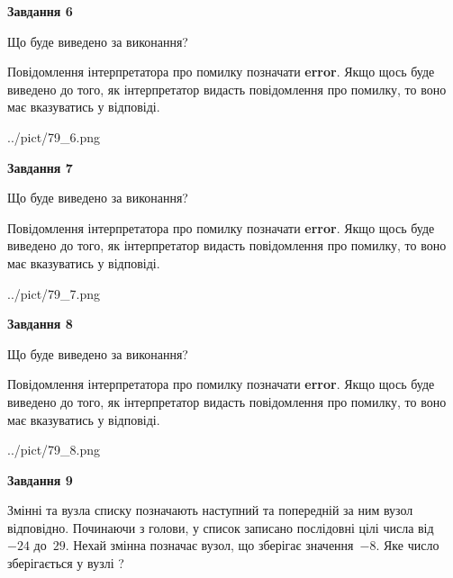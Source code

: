 \documentclass[12pt, ukrainian]{article}
\begin{document}
{\begin {large}
{\begin {center}\textbf{Завдання 6}\end {center}}\par
Що буде виведено за виконання?

Повідомлення інтерпретатора про помилку позначати \textbf{error}.
Якщо щось буде виведено до того, як інтерпретатор видасть повідомлення про помилку, 
то воно має вказуватись у відповіді. \par


\begin{center}
	{../pict/79_6.png}
\end{center}
\newpage

{\begin {center}\textbf{Завдання 7}\end {center}}\par
Що буде виведено за виконання?

Повідомлення інтерпретатора про помилку позначати \textbf{error}.
Якщо щось буде виведено до того, як інтерпретатор видасть повідомлення про помилку, 
то воно має вказуватись у відповіді. \par


\begin{center}
	{../pict/79_7.png}
\end{center}
\newpage

{\begin {center}\textbf{Завдання 8}\end {center}}\par
Що буде виведено за виконання?

Повідомлення інтерпретатора про помилку позначати \textbf{error}.
Якщо щось буде виведено до того, як інтерпретатор видасть повідомлення про помилку, 
то воно має вказуватись у відповіді. \par


\begin{center}
	{../pict/79_8.png}
\end{center}
\newpage

{\begin {center}\textbf{Завдання 9}\end {center}}\par
Змінні  та  вузла списку позначають наступний та попередній за ним вузол відповідно. Починаючи з голови, у список записано послідовні цілі числа від~$-24$ до~$29$. Нехай змінна  позначає вузол, що зберігає значення~$-8$.
Яке число зберігається у вузлі  ?\par
\newpage


\end{large}}
\end{document}
